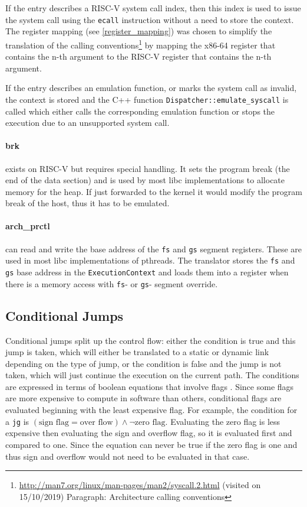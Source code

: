 	If the entry describes a RISC-V system call index, then this index is used to issue the system call using the \texttt{ecall} instruction without a need to store the context. The register mapping (see \ref{register_mapping}) was chosen to simplify the translation of the calling conventions\footnote{\url{http://man7.org/linux/man-pages/man2/syscall.2.html} (visited on 15/10/2019) Paragraph: Architecture calling conventions} by mapping the x86-64 register that contains the n-th argument to the RISC-V register that contains the n-th argument.
	
	If the entry describes an emulation function, or marks the system call as invalid, the context is stored and the C++ function \texttt{Dispatcher::emulate\_syscall} is called which either calls the corresponding emulation function or stops the execution due to an unsupported system call.
	
	\paragraph{brk}
		exists on RISC-V but requires special handling. It sets the program break (the end of the data section) and is used by most libc implementations to allocate memory for the heap. If just forwarded to the kernel it would modify the program break of the host, thus it has to be emulated.
		
	\paragraph{arch\_prctl}
		can read and write the base address of the \texttt{fs} and \texttt{gs} segment registers. These are used in most libc implementations of pthreads. The translator stores the \texttt{fs} and \texttt{gs} base address in the \texttt{ExecutionContext} and loads them into a register when there is a memory access with \texttt{fs}- or \texttt{gs}- segment override.

\subsection{Conditional Jumps}
	Conditional jumps split up the control flow: either the condition is true and this jump is taken, which will either be translated to a static or dynamic link depending on the type of jump, or the condition is false and the jump is not taken, which will just continue the execution on the current path. The conditions are expressed in terms of boolean equations that involve flags \cite[Volume 1 Appendix B.1]{x86-64isa}. Since some flags are more expensive to compute in software than others, conditional flags are evaluated beginning with the least expensive flag. For example, the condition for a \texttt{jg} is \((\text{sign flag} = \text{over flow}) \land \lnot \text{zero flag}\). Evaluating the zero flag is less expensive then evaluating the sign and overflow flag, so it is evaluated first and compared to one. Since the equation can never be true if the zero flag is one and thus sign and overflow would not need to be evaluated in that case.

